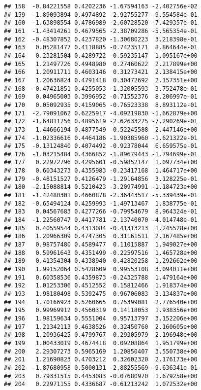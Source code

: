 \documentclass[
]{article}
\begin{document}
\begin{verbatim}
## 158  -0.84221558 0.4202236 -1.67594163 -2.402756e-02
## 159  -1.89093894 0.4974892 -2.92755277 -9.554584e-01
## 160  -1.63898554 0.4786989 -2.60728520 -7.429357e-01
## 161  -1.43414261 0.4679565 -2.38709286 -5.565354e-01
## 162  -0.48307852 0.4237820 -1.30680223  3.218398e-01
## 163   0.05281477 0.4118885 -0.74235171  8.864644e-01
## 164   0.23281504 0.4289722 -0.59235147  1.095167e+00
## 165   1.21497726 0.4948980  0.27460622  2.217899e+00
## 166   1.20911711 0.4603146  0.31273421  2.138415e+00
## 167   1.20636824 0.4791418  0.30472692  2.157351e+00
## 168  -0.47421851 0.4255053 -1.32005593  3.752478e-01
## 169   0.04965003 0.3996952 -0.71552376  8.206997e-01
## 170   0.05092935 0.4159065 -0.76523338  8.893112e-01
## 171  -2.79091062 0.6225917 -4.09219830 -1.662879e+00
## 172  -1.64811756 0.4895619 -2.62633275 -7.290269e-01
## 173   1.44666194 0.4877549  0.52245588  2.447146e+00
## 174  -1.02336616 0.4464186 -1.90385960 -1.621322e-01
## 175  -0.13124840 0.4074492 -0.92378044  6.659575e-01
## 176  -1.03215484 0.4366852 -1.89679443 -1.794699e-01
## 177   0.22972796 0.4295601 -0.59852147  1.097734e+00
## 178   0.60343273 0.4355983 -0.23417168  1.464717e+00
## 179  -0.48151527 0.4126479 -1.29164856  3.128225e-01
## 180  -2.15088814 0.5210423 -3.20974991 -1.184723e+00
## 181  -1.42480301 0.4660878 -2.36443517 -5.339439e-01
## 182  -0.65494124 0.4259993 -1.49713467  1.838775e-01
## 183   0.04567683 0.4277266 -0.79954679  8.964324e-01
## 184  -1.22560747 0.4417781 -2.13740070 -4.014748e-01
## 185   0.40559544 0.4313084 -0.41313213  1.245528e+00
## 186   1.20966309 0.4747305  0.31161511  2.167485e+00
## 187   0.98757480 0.4589477  0.11015887  1.949027e+00
## 188   0.59961643 0.4351499 -0.22597516  1.465728e+00
## 189   0.41354304 0.4338940 -0.42820258  1.292662e+00
## 190   1.99152064 0.5428609  0.99553108  3.094011e+00
## 191   0.60358536 0.4359873 -0.24325788  1.479164e+00
## 192   1.01253306 0.4512552  0.15812466  1.918374e+00
## 193   1.98180498 0.5392475  0.96706083  3.134837e+00
## 194   1.70166923 0.5260665  0.75399081  2.776540e+00
## 195   0.99969912 0.4560319  0.14118053  1.938356e+00
## 196   1.98159634 0.5551004  0.95713797  3.152206e+00
## 197   1.21342113 0.4638526  0.32450760  2.160605e+00
## 198   1.20936425 0.4799767  0.29305979  2.196948e+00
## 199   1.00433019 0.4674418  0.09208864  1.951799e+00
## 200   2.29307273 0.5965169  1.20850407  3.550738e+00
## 201   1.21690823 0.4703212  0.32602320  2.176173e+00
## 202  -1.87680958 0.5000131 -2.88255569 -9.636341e-01
## 203   0.79331515 0.4453083 -0.07680970  1.679258e+00
## 204   0.22971155 0.4336687 -0.61213242  1.072532e+00

\end{verbatim}
\end{document}
